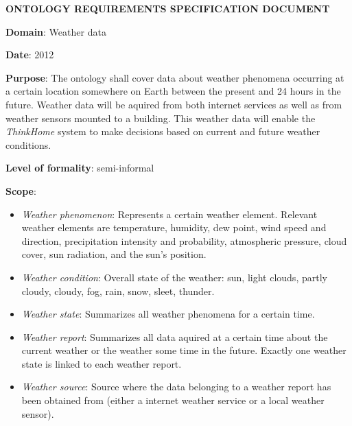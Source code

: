 \begin{mdframed}
\setlength{\parindent}{0pt}
\MakeUppercase{\textbf{Ontology requirements specification document}}

\vspace{.5cm}

\textbf{Domain}: Weather data

\vspace{.2cm}

\textbf{Date}: 2012 %

\vspace{.2cm}

\textbf{Purpose}: The ontology shall cover data about weather phenomena occurring at a certain location somewhere on Earth between the present and 24 hours in the future. Weather data will be aquired from both internet services as well as from weather sensors mounted to a building. This weather data will enable the \textit{ThinkHome} system to make decisions based on current and future weather conditions.

\vspace{.2cm}

\textbf{Level of formality}: semi-informal %

\vspace{.2cm}

\textbf{Scope}:

\begin{itemize}
  \item \emph{Weather phenomenon}: Represents a certain weather element. Relevant weather elements are temperature, humidity, dew point, wind speed and direction, precipitation intensity and probability, atmospheric pressure, cloud cover, sun radiation, and the sun's position.

  \item \emph{Weather condition}: Overall state of the weather: sun, light clouds, partly cloudy, cloudy, fog, rain, snow, sleet, thunder.
  \item \emph{Weather state}: Summarizes all weather phenomena for a certain time. 
  \item \emph{Weather report}: Summarizes all data aquired at a certain time about the current weather or the weather some time in the future. Exactly one weather state is linked to each weather report.
  \item \emph{Weather source}: Source where the data belonging to a weather report has been obtained from (either a internet weather service or a local weather sensor).
\end{itemize}


\end{mdframed}
